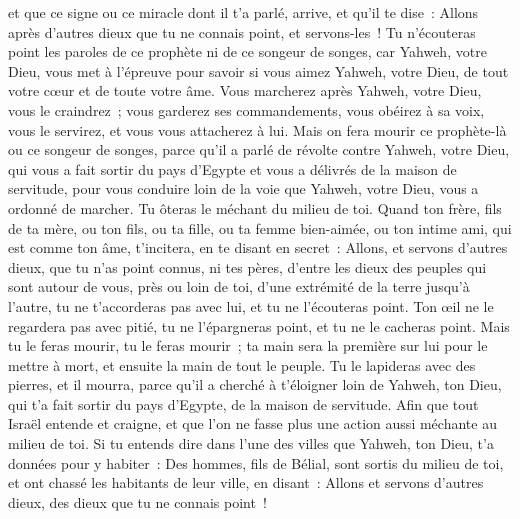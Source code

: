 \begin{multicols}{2}
et que ce signe ou ce miracle dont il t'a parlé, arrive, et qu'il te dise~: Allons après d'autres dieux que tu ne connais point, et servons-les~!
Tu n'écouteras point les paroles de ce prophète ni de ce songeur de songes, car Yahweh, votre Dieu, vous met à l'épreuve pour savoir si vous aimez Yahweh, votre Dieu, de tout votre cœur et de toute votre âme.
Vous marcherez après Yahweh, votre Dieu, vous le craindrez~; vous garderez ses commandements, vous obéirez à sa voix, vous le servirez, et vous vous attacherez à lui.
Mais on fera mourir ce prophète-là ou ce songeur de songes, parce qu'il a parlé de révolte contre Yahweh, votre Dieu, qui vous a fait sortir du pays d'Egypte et vous a délivrés de la maison de servitude, pour vous conduire loin de la voie que Yahweh, votre Dieu, vous a ordonné de marcher. Tu ôteras le méchant du milieu de toi.
Quand ton frère, fils de ta mère, ou ton fils, ou ta fille, ou ta femme bien-aimée, ou ton intime ami, qui est comme ton âme, t'incitera, en te disant en secret~: Allons, et servons d'autres dieux, que tu n'as point connus, ni tes pères,
d'entre les dieux des peuples qui sont autour de vous, près ou loin de toi, d'une extrémité de la terre jusqu'à l'autre,
tu ne t'accorderas pas avec lui, et tu ne l'écouteras point. Ton œil ne le regardera pas avec pitié, tu ne l'épargneras point, et tu ne le cacheras point.
Mais tu le feras mourir, tu le feras mourir~; ta main sera la première sur lui pour le mettre à mort, et ensuite la main de tout le peuple.
Tu le lapideras avec des pierres, et il mourra, parce qu'il a cherché à t'éloigner loin de Yahweh, ton Dieu, qui t'a fait sortir du pays d'Egypte, de la maison de servitude.
Afin que tout Israël entende et craigne, et que l'on ne fasse plus une action aussi méchante au milieu de toi.
Si tu entends dire dans l'une des villes que Yahweh, ton Dieu, t'a données pour y habiter~:
Des hommes, fils de Bélial, sont sortis du milieu de toi, et ont chassé les habitants de leur ville, en disant~: Allons et servons d'autres dieux, des dieux que tu ne connais point~!

\end{multicols}

